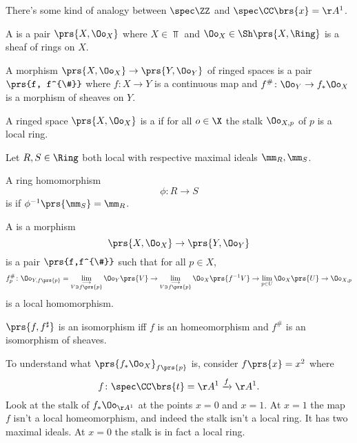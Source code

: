 \documentclass[10pt,a4paper,twoside,openany,hidelinks]{book}
\begin{document}
\begin{remark}
There's some kind of analogy between $\spec \ZZ$ and $\spec \CC\brs{x} = \AA^1$.
\end{remark}

\begin{definition}
A  is a pair $\prs{X, \Oo_X}$ where $X \in \Top$ and $\Oo_X \in \Sh\prs{X, \Ring}$ is a sheaf of rings on $X$.
\end{definition}

\begin{definition}
A morphism $\prs{X, \Oo_X} \to \prs{Y, \Oo_Y}$ of ringed spaces is a pair $\prs{f, f^{\#}}$ where $f \colon X \to Y$ is a continuous map and $f^{\#} \colon \Oo_Y \to f_* \Oo_X$ is a morphism of sheaves on $Y$.
\end{definition}

\begin{definition}
A ringed space $\prs{X, \Oo_X}$ is a  if for all $o \in \X$ the stalk $\Oo_{X,p}$ of $p$ is a local ring.
\end{definition}

\begin{definition}
Let $R,S \in \Ring$ both local with respective maximal ideals $\mm_R, \mm_S$.

A ring homomorphism
\[\phi \colon R \to S\]
is  if $\phi^{-1}\prs{\mm_S} = \mm_R$.
\end{definition}

\begin{definition}
A  is a morphism
\[\prs{X, \Oo_X} \to \prs{Y, \Oo_Y}\]
is a pair $\prs{f,f^{\#}}$ such that for all $p \in X$,
\[f_p^{\#} \colon \Oo_{Y, f\prs{p}} = \lim_{\substack{\longrightarrow \\ V \ni f\prs{p}}} \Oo_Y\prs{V} \to \lim_{\substack{\longrightarrow \\ V \ni f\prs{p}}} \Oo_X\prs{f^{-1} V}
\to \lim_{p \in U} \Oo_X\prs{U} \to \Oo_{X, p}\]
is a local homomorphism.
\end{definition}

\begin{remark}
$\prs{f, f^{\sharp}}$ is an isomorphism iff $f$ is an homeomorphism and $f^{\#}$ is an isomorphism of sheaves.
\end{remark}

\begin{example}
To understand what $\prs{f_* \Oo_X}_{f\prs{p}}$ is, consider $f\prs{x} = x^2$ where
\[f \colon \spec \CC\brs{t} = \AA^1 \xrightarrow{f} \AA^1 \text{.}\]
Look at the stalk of $f_* \Oo_{\AA^1}$ at the points $x=0$ and $x=1$.
At $x=1$ the map $f$ isn't a local homeomorphism, and indeed the stalk isn't a local ring. It has two maximal ideals. At $x=0$ the stalk is in fact a local ring.
\end{example}
\end{document}
